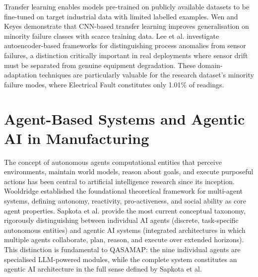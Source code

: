

Transfer learning enables models pre-trained on publicly available datasets to be fine-tuned on target industrial data with limited labelled examples. Wen and Keyes \cite{wen_time_2019} demonstrate that CNN-based transfer learning improves generalisation on minority failure classes with scarce training data. Lee et al. \cite{lee_autoencoder-based_2024} investigate autoencoder-based frameworks for distinguishing process anomalies from sensor failures, a distinction critically important in real deployments where sensor drift must be separated from genuine equipment degradation. These domain-adaptation techniques are particularly valuable for the research dataset's minority failure modes, where Electrical Fault constitutes only 1.01\% of readings.

\section{Agent-Based Systems and Agentic AI in Manufacturing}



The concept of autonomous agents computational entities that perceive environments, maintain world models, reason about goals, and execute purposeful actions has been central to artificial intelligence research since its inception. Wooldridge \cite{Wooldridge1995} established the foundational theoretical framework for multi-agent systems, defining autonomy, reactivity, pro-activeness, and social ability as core agent properties. Sapkota et al. \cite{sapkota_ai_2026} provide the most current conceptual taxonomy, rigorously distinguishing between individual AI agents (discrete, task-specific autonomous entities) and agentic AI systems (integrated architectures in which multiple agents collaborate, plan, reason, and execute over extended horizons). This distinction is fundamental to QASAMAP: the nine individual agents are specialised LLM-powered modules, while the complete system constitutes an agentic AI architecture in the full sense defined by Sapkota et al.


